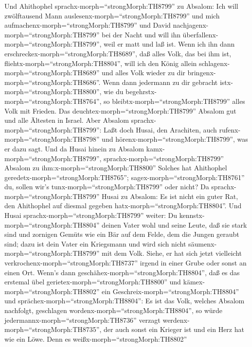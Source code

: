  Und Ahithophel sprachx-morph=``strongMorph:TH8799'' zu
Absalom: Ich will zwölftausend Mann
auslesenx-morph=``strongMorph:TH8799'' und mich
aufmachenx-morph=``strongMorph:TH8799'' und David
nachjagenx-morph=``strongMorph:TH8799'' bei der Nacht  und
will ihn überfallenx-morph=``strongMorph:TH8799'', weil er matt und laß
ist. Wenn ich ihn dann erschreckex-morph=``strongMorph:TH8689'', daß
alles Volk, das bei ihm ist, fliehtx-morph=``strongMorph:TH8804'', will
ich den König allein schlagenx-morph=``strongMorph:TH8689'' 
und alles Volk wieder zu dir bringenx-morph=``strongMorph:TH8686''. Wenn
dann jedermann zu dir gebracht istx-morph=``strongMorph:TH8800'', wie du
begehrstx-morph=``strongMorph:TH8764'', so
bleibtx-morph=``strongMorph:TH8799'' alles Volk mit Frieden.
 Das deuchtex-morph=``strongMorph:TH8799'' Absalom gut und
alle Ältesten in Israel.  Aber Absalom
sprachx-morph=``strongMorph:TH8799'': Laßt doch Husai, den Arachiten,
auch rufenx-morph=``strongMorph:TH8798'' und
hörenx-morph=``strongMorph:TH8799'', was er dazu sagt.  Und
da Husai hinein zu Absalom kamx-morph=``strongMorph:TH8799'',
sprachx-morph=``strongMorph:TH8799'' Absalom zu
ihm:x-morph=``strongMorph:TH8800'' Solches hat Ahithophel
geredetx-morph=``strongMorph:TH8765'';
sagex-morph=``strongMorph:TH8761'' du, sollen wir's
tunx-morph=``strongMorph:TH8799'' oder nicht?  Da
sprachx-morph=``strongMorph:TH8799'' Husai zu Absalom: Es ist nicht ein
guter Rat, den Ahithophel auf diesmal gegeben
hatx-morph=``strongMorph:TH8804''.  Und Husai
sprachx-morph=``strongMorph:TH8799'' weiter: Du
kennstx-morph=``strongMorph:TH8804'' deinen Vater wohl und seine Leute,
daß sie stark sind und zornigen Gemüts wie ein Bär auf dem Felde, dem
die Jungen geraubt sind; dazu ist dein Vater ein Kriegsmann und wird
sich nicht säumenx-morph=``strongMorph:TH8799'' mit dem Volk.
 Siehe, er hat sich jetzt vielleicht
verkrochenx-morph=``strongMorph:TH8737'' irgend in einer Grube oder
sonst an einen Ort. Wenn's dann geschähex-morph=``strongMorph:TH8804'',
daß es das erstemal übel gerietex-morph=``strongMorph:TH8800'' und
kämex-morph=``strongMorph:TH8802'' ein
Geschreix-morph=``strongMorph:TH8804'' und
sprächex-morph=``strongMorph:TH8804'': Es ist das Volk, welches Absalom
nachfolgt, geschlagen wordenx-morph=``strongMorph:TH8804'',
 so würde jedermannx-morph=``strongMorph:TH8736'' verzagt
werdenx-morph=``strongMorph:TH8735'', der auch sonst ein Krieger ist und
ein Herz hat wie ein Löwe. Denn es weißx-morph=``strongMorph:TH8802''
